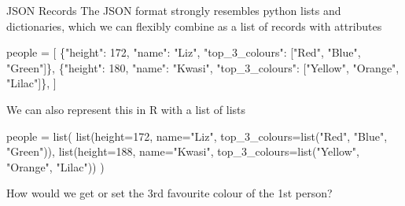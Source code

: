 \documentclass[
  10pt,
  ignorenonframetext,
  aspectratio=169]{beamer}
\newenvironment{Shaded}{\begin{snugshade}}{\end{snugshade}}
\newcommand{\AttributeTok}[1]{\textcolor[rgb]{0.80,0.80,0.80}{#1}}
\newcommand{\DecValTok}[1]{\textcolor[rgb]{0.86,0.86,0.80}{#1}}
\newcommand{\FunctionTok}[1]{\textcolor[rgb]{0.94,0.94,0.56}{#1}}
\newcommand{\NormalTok}[1]{\textcolor[rgb]{0.80,0.80,0.80}{#1}}
\newcommand{\OperatorTok}[1]{\textcolor[rgb]{0.94,0.94,0.82}{#1}}
\newcommand{\OtherTok}[1]{\textcolor[rgb]{0.94,0.94,0.56}{#1}}
\newcommand{\StringTok}[1]{\textcolor[rgb]{0.80,0.58,0.58}{#1}}
\begin{document}
\begin{frame}[fragile]{JSON Records}
\protect\hypertarget{json-records}{}
The JSON format strongly resembles python lists and dictionaries, which
we can flexibly combine as a list of records with attributes

\scriptsize

\begin{Shaded}
\begin{Highlighting}[]
\NormalTok{people }\OperatorTok{=}\NormalTok{ [}
\NormalTok{  \{}\StringTok{"height"}\NormalTok{: }\DecValTok{172}\NormalTok{, }\StringTok{"name"}\NormalTok{: }\StringTok{"Liz"}\NormalTok{, }\StringTok{"top\_3\_colours"}\NormalTok{: [}\StringTok{"Red"}\NormalTok{, }\StringTok{"Blue"}\NormalTok{, }\StringTok{"Green"}\NormalTok{]\},}
\NormalTok{  \{}\StringTok{"height"}\NormalTok{: }\DecValTok{180}\NormalTok{, }\StringTok{"name"}\NormalTok{: }\StringTok{"Kwasi"}\NormalTok{, }\StringTok{"top\_3\_colours"}\NormalTok{: [}\StringTok{"Yellow"}\NormalTok{, }\StringTok{"Orange"}\NormalTok{, }\StringTok{"Lilac"}\NormalTok{]\},}
\NormalTok{]}
\end{Highlighting}
\end{Shaded}

\medskip
\normalsize

We can also represent this in R with a list of lists

\scriptsize

\begin{Shaded}
\begin{Highlighting}[]
\NormalTok{people }\OtherTok{=} \FunctionTok{list}\NormalTok{(}
  \FunctionTok{list}\NormalTok{(}\AttributeTok{height=}\DecValTok{172}\NormalTok{, }\AttributeTok{name=}\StringTok{"Liz"}\NormalTok{, }\AttributeTok{top\_3\_colours=}\FunctionTok{list}\NormalTok{(}\StringTok{"Red"}\NormalTok{, }\StringTok{"Blue"}\NormalTok{, }\StringTok{"Green"}\NormalTok{)),}
  \FunctionTok{list}\NormalTok{(}\AttributeTok{height=}\DecValTok{188}\NormalTok{, }\AttributeTok{name=}\StringTok{"Kwasi"}\NormalTok{, }\AttributeTok{top\_3\_colours=}\FunctionTok{list}\NormalTok{(}\StringTok{"Yellow"}\NormalTok{, }\StringTok{"Orange"}\NormalTok{, }\StringTok{"Lilac"}\NormalTok{))}
\NormalTok{)}
\end{Highlighting}
\end{Shaded}

\normalsize

How would we get or set the 3rd favourite colour of the 1st person?
\end{frame}
\end{document}
